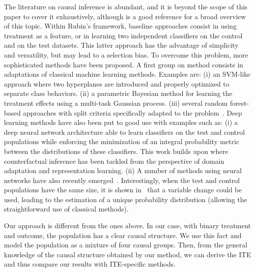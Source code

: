 
\label{section:related work}
The literature on causal inference is abundant, and it is beyond the scope of this paper to cover it exhaustively, although \cite{Pearl_2009} is a good reference for a broad overview of this topic. Within Rubin's framework, baseline approaches consist in using treatment as a feature, or in learning two independent classifiers on the control and on the test datasets. This latter approach has the advantage of simplicity and versatility, but may lead to a selection bias. To overcome this problem, more sophisticated methods have been proposed. A first group on method consists in adaptations of classical machine learning methods. Examples are: (i) an SVM-like approach \cite{zaniewicz2013support} where two hyperplanes are introduced and properly optimized to separate class behaviors.
    (ii) a parametric Bayesian method \cite{alaa2017bayesian} for learning the treatment effects using a multi-task Gaussian process.
    (iii) several random forest-based approaches with  split criteria specifically adapted to the problem~\cite{wager2018estimation}.
Deep learning methods have also been put to good use with examples such as:
(i) a deep neural network architecture \cite{shalit2017estimating} able to learn classifiers on the test and control populations while enforcing the minimization of an integral probability metric between the distributions of these classifiers. This work builds upon \cite{johansson2016learning} where counterfactual inference has been tackled from the perspective of domain adaptation and representation learning. 
   (ii) A number of methods using neural networks have also recently emerged~\cite{yoon2018ganite,louizos2017causal}.
Interestingly, when the test and control populations have the same size, it is shown in~\cite{Jaskowski2012} that a variable change could be used, leading to the estimation of a unique probability distribution (allowing the straightforward use of classical methods).

Our approach is different from the ones above. In our case, with binary treatment and outcome, the population has a clear causal structure. We use this fact and model the population as a mixture of four causal groups. Then, from the general knowledge of the causal structure obtained by our method, we can derive the ITE and thus compare our results with ITE-specific methods.



